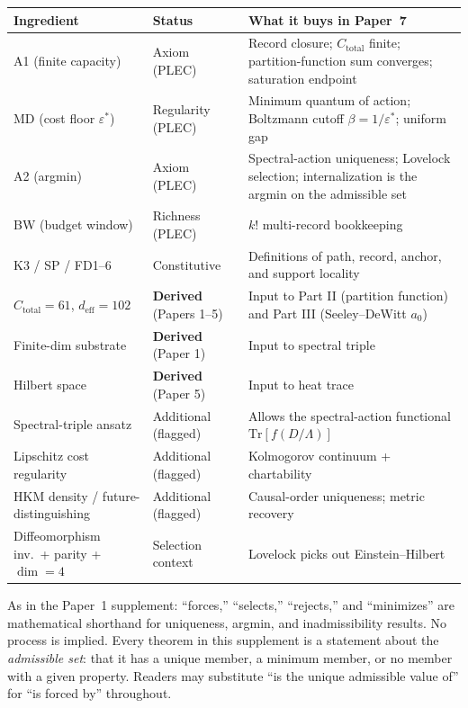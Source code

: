 \documentclass[11pt,a4paper]{article}
\theoremstyle{definition}
\newcommand{\epsstar}{\varepsilon^{\ast}}
\newcommand{\Ctot}{C_{\mathrm{total}}}
\newcommand{\deff}{d_{\mathrm{eff}}}
\newcommand{\Tr}{\mathrm{Tr}}
\begin{document}
\medskip

\begin{tcolorbox}[apfbox, title={What is assumed vs.\ what is derived (condensed audit)}]
\footnotesize
\renewcommand{\arraystretch}{1.15}
\begin{tabular}{@{}p{3.2cm}lp{8.2cm}@{}}
\toprule
\textbf{Ingredient} & \textbf{Status} & \textbf{What it buys in Paper~7}\\
\midrule
A1 (finite capacity) & Axiom (PLEC) & Record closure; $\Ctot$ finite; partition-function sum converges; saturation endpoint\\
MD (cost floor $\epsstar$) & Regularity (PLEC) & Minimum quantum of action; Boltzmann cutoff $\beta=1/\epsstar$; uniform gap\\
A2 (argmin) & Axiom (PLEC) & Spectral-action uniqueness; Lovelock selection; internalization is the argmin on the admissible set\\
BW (budget window) & Richness (PLEC) & $k!$ multi-record bookkeeping\\
K3 / SP / FD1--6 & Constitutive & Definitions of path, record, anchor, and support locality\\
$\Ctot=61$, $\deff=102$ & \textbf{Derived} (Papers 1--5) & Input to Part II (partition function) and Part III (Seeley--DeWitt $a_0$)\\
Finite-dim substrate & \textbf{Derived} (Paper 1) & Input to spectral triple\\
Hilbert space & \textbf{Derived} (Paper 5) & Input to heat trace\\
Spectral-triple ansatz & Additional (flagged) & Allows the spectral-action functional $\Tr[f(D/\Lambda)]$\\
Lipschitz cost regularity & Additional (flagged) & Kolmogorov continuum + chartability\\
HKM density / future-distinguishing & Additional (flagged) & Causal-order uniqueness; metric recovery\\
Diffeomorphism inv.\ + parity + $\dim=4$ & Selection context & Lovelock picks out Einstein--Hilbert\\
\bottomrule
\end{tabular}
\end{tcolorbox}

\medskip

\begin{tcolorbox}[apfbox, title={Framing convention: ``forces'' denotes uniqueness, not process}]
\footnotesize
As in the Paper~1 supplement: ``forces,'' ``selects,'' ``rejects,'' and ``minimizes'' are mathematical shorthand for uniqueness, argmin, and inadmissibility results.  No process is implied.  Every theorem in this supplement is a statement about the \emph{admissible set}: that it has a unique member, a minimum member, or no member with a given property.  Readers may substitute ``is the unique admissible value of'' for ``is forced by'' throughout.
\end{tcolorbox}
\end{document}
